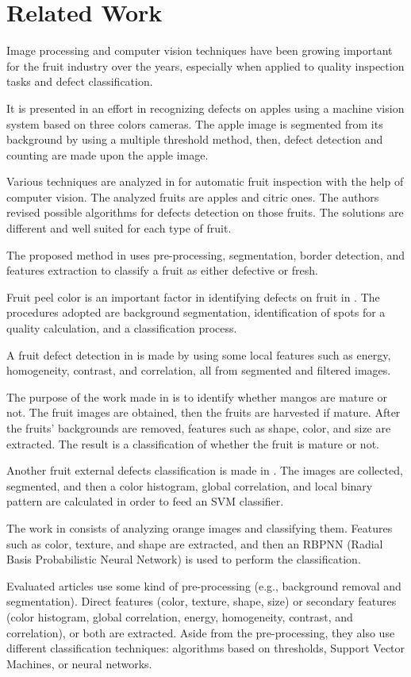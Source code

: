 \documentclass[../main.tex]{subfile}
\begin{document}
\section{Related Work} \label{sec:related-work}
Image processing and computer vision techniques have been growing important for the fruit industry over the years, especially when applied to quality inspection tasks and defect classification.

It is presented in \cite{II-item1} an effort in recognizing defects on apples using a machine vision system based on three colors cameras. The apple image is segmented from its background by using a multiple threshold method, then, defect detection and counting are made upon the apple image.

Various techniques are analyzed in \cite{II-item2} for automatic fruit inspection with the help of computer vision. The analyzed fruits are apples and citric ones. The authors revised possible algorithms for defects detection on those fruits. The solutions are different and well suited for each type of fruit.

The proposed method in \cite{II-item3} uses pre-processing, segmentation, border detection, and features extraction to classify a fruit as either defective or fresh.

Fruit peel color is an important factor in identifying defects on fruit in \cite{II-item4}. The procedures adopted are background segmentation, identification of spots for a quality calculation, and a classification process.

A fruit defect detection in \cite{II-item5} is made by using some local features such as energy, homogeneity, contrast, and correlation, all from segmented and filtered images.

The purpose of the work made in \cite{II-item6} is to identify whether mangos are mature or not. The fruit images are obtained, then the fruits are harvested if mature. After the fruits' backgrounds are removed, features such as shape, color, and size are extracted. The result is a classification of whether the fruit is mature or not.

Another fruit external defects classification is made in \cite{II-item7}. The images are collected, segmented, and then a color histogram, global correlation, and local binary pattern are calculated in order to feed an SVM classifier.

The work in \cite{II-item8} consists of analyzing orange images and classifying them. Features such as color, texture, and shape are extracted, and then an RBPNN (Radial Basis Probabilistic Neural Network) is used to perform the classification.

Evaluated articles use some kind of pre-processing (e.g., background removal and segmentation). Direct features (color, texture, shape, size) or secondary features (color histogram, global correlation, energy, homogeneity, contrast, and correlation), or both are extracted. Aside from the pre-processing, they also use different classification techniques: algorithms based on thresholds, Support Vector Machines, or neural networks.
\end{document}
